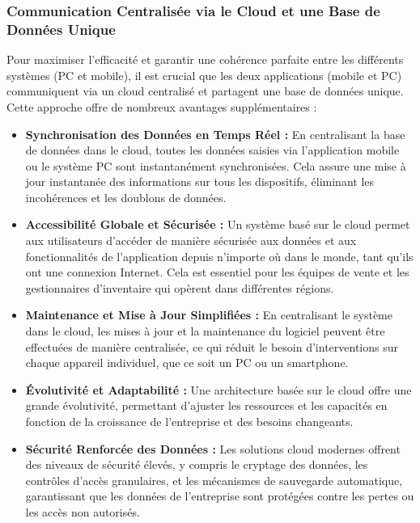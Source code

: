 \documentclass[a4paper, oneside, 12pt, final]{extreport}
\begin{document}
\subsubsection{Communication Centralisée via le Cloud et une Base de Données Unique}
Pour maximiser l'efficacité et garantir une cohérence parfaite entre les différents systèmes (PC et mobile), il est crucial que les deux applications (mobile et PC) communiquent via un cloud centralisé et partagent une base de données unique. Cette approche offre de nombreux avantages supplémentaires :
\begin{itemize}
\item \textbf{Synchronisation des Données en Temps Réel :} En centralisant la base de données dans le cloud, toutes les données saisies via l'application mobile ou le système PC sont instantanément synchronisées. Cela assure une mise à jour instantanée des informations sur tous les dispositifs, éliminant les incohérences et les doublons de données.

\item \textbf{Accessibilité Globale et Sécurisée :} Un système basé sur le cloud permet aux utilisateurs d'accéder de manière sécurisée aux données et aux fonctionnalités de l'application depuis n'importe où dans le monde, tant qu'ils ont une connexion Internet. Cela est essentiel pour les équipes de vente et les gestionnaires d'inventaire qui opèrent dans différentes régions.

\item \textbf{Maintenance et Mise à Jour Simplifiées :} En centralisant le système dans le cloud, les mises à jour et la maintenance du logiciel peuvent être effectuées de manière centralisée, ce qui réduit le besoin d'interventions sur chaque appareil individuel, que ce soit un PC ou un smartphone.

\item \textbf{Évolutivité et Adaptabilité :} Une architecture basée sur le cloud offre une grande évolutivité, permettant d'ajuster les ressources et les capacités en fonction de la croissance de l'entreprise et des besoins changeants.

\item \textbf{Sécurité Renforcée des Données :} Les solutions cloud modernes offrent des niveaux de sécurité élevés, y compris le cryptage des données, les contrôles d'accès granulaires, et les mécanismes de sauvegarde automatique, garantissant que les données de l'entreprise sont protégées contre les pertes ou les accès non autorisés.
\end{itemize}
\end{document}
